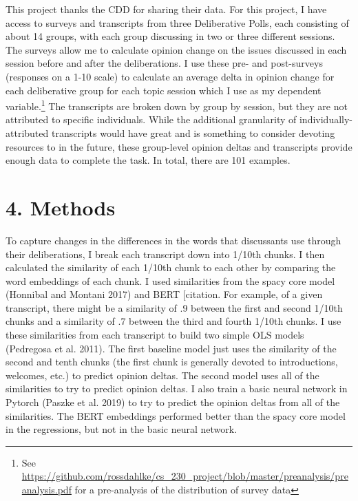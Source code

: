 \documentclass[12pt,]{article}
\begin{document}
This project thanks the CDD for sharing their data. For this project, I
have access to surveys and transcripts from three Deliberative Polls,
each consisting of about 14 groups, with each group discussing in two or
three different sessions. The surveys allow me to calculate opinion
change on the issues discussed in each session before and after the
deliberations. I use these pre- and post-surveys (responses on a 1-10
scale) to calculate an average delta in opinion change for each
deliberative group for each topic session which I use as my dependent
variable.\footnote{See
  \url{https://github.com/rossdahlke/cs_230_project/blob/master/preanalysis/preanalysis.pdf}
  for a pre-analysis of the distribution of survey data} The transcripts
are broken down by group by session, but they are not attributed to
specific individuals. While the additional granularity of
individually-attributed transcripts would have great and is something to
consider devoting resources to in the future, these group-level opinion
deltas and transcripts provide enough data to complete the task. In
total, there are 101 examples.

\hypertarget{methods}{%
\section{4. Methods}\label{methods}}

To capture changes in the differences in the words that discussants use
through their deliberations, I break each transcript down into 1/10th
chunks. I then calculated the similarity of each 1/10th chunk to each
other by comparing the word embeddings of each chunk. I used
similarities from the spacy core model (Honnibal and Montani 2017) and
BERT {[}citation. For example, of a given transcript, there might be a
similarity of .9 between the first and second 1/10th chunks and a
similarity of .7 between the third and fourth 1/10th chunks. I use these
similarities from each transcript to build two simple OLS models
(Pedregosa et al. 2011). The first baseline model just uses the
similarity of the second and tenth chunks (the first chunk is generally
devoted to introductions, welcomes, etc.) to predict opinion deltas. The
second model uses all of the similarities to try to predict opinion
deltas. I also train a basic neural network in Pytorch (Paszke et al.
2019) to try to predict the opinion deltas from all of the similarities.
The BERT embeddings performed better than the spacy core model in the
regressions, but not in the basic neural network.
\end{document}
